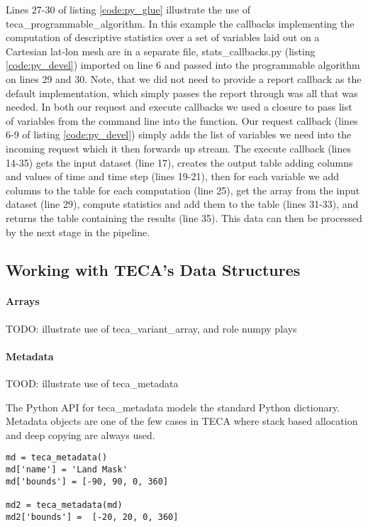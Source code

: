 \documentclass[a4paper,10pt,DIV=12]{scrreprt}
\begin{document}
Lines 27-30 of listing \ref{code:py_glue} illustrate the use of teca\_programmable\_algorithm. In this example the callbacks implementing the computation of descriptive statistics over a set of variables laid out on a Cartesian lat-lon mesh are in a separate file, stats\_callbacks.py (listing \ref{code:py_devel}) imported on line 6 and passed into the programmable algorithm on lines 29 and 30. Note, that we did not need to provide a report callback as the default implementation, which simply passes the report through was all that was needed. In both our request and execute callbacks we used a closure to pass list of variables from the command line into the function. Our request callback (lines 6-9 of listing \ref{code:py_devel}) simply adds the list of variables we need into the incoming request which it then forwards up stream. The execute callback (lines 14-35) gets the input dataset (line 17), creates the output table adding columns and values of time and time step (lines 19-21), then for each variable we add columns to the table for each computation (line 25), get the array from the input dataset (line 29), compute statistics and add them to the table (lines 31-33), and returns the table containing the results (line 35). This data can then be processed by the next stage in the pipeline.

\subsection{Working with TECA's Data Structures}
\paragraph{Arrays}
TODO: illustrate use of teca\_variant\_array, and role numpy plays

\paragraph{Metadata}
TOOD: illustrate use of teca\_metadata

The Python API for teca\_metadata models the standard Python dictionary. Metadata objects are one of the few cases in TECA where stack based allocation and deep copying are always used.
\begin{verbatim}
md = teca_metadata()
md['name'] = 'Land Mask'
md['bounds'] = [-90, 90, 0, 360]

md2 = teca_metadata(md)
md2['bounds'] =  [-20, 20, 0, 360]
\end{verbatim}
\end{document}

